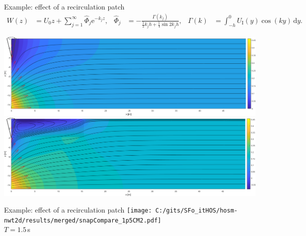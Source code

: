\documentclass{sintefbeamer}
\newcommand{\mr}{\mathrm}
\newcommand{\mc}{\mathcal}
\newcommand{\ee}{\mr{e}}
\renewcommand{\_}[1]{_\mr{#1}}
\begin{document}
\begin{frame}{Example: effect of a recirculation patch}
\vspace{-1cm}
\footnotesize
\begin{align*}
W(z) &= U_0 z + \sum_{j=1}^\infty \hat\Phi_j \ee^{-k_jz},& %
\hat\Phi_j &= -\frac{\Gamma(k_j)}{\frac12 k_j h + \frac14\sin2k_jh},&
\Gamma(k) &= \int_{-h}^0 \!U\_I(y)\cos(k y)\,\mr d y.
\end{align*}
\begin{equation*}
\end{equation*}

\begin{center}
	\includegraphics[width=.7\columnwidth]{currNoVortexBM.png}\\
	\includegraphics[width=.7\columnwidth]{currVortexBM.png}%
\end{center}
\end{frame}


\begin{frame}{Example: effect of a recirculation patch}
	\vspace{-5mm}
	\centering
	\texttt{[image: C:/gits/SFo\_gitHOS/hosm-nwt2d/results/merged/snapCompare\_T1p5CM2.pdf]}\\
	$T=1.5$\,s
\end{frame}
\end{document}
